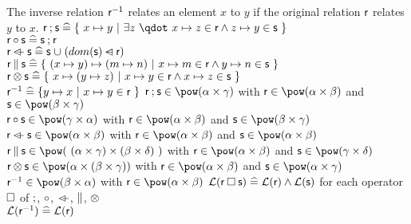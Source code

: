 \begin{samepage}
\begin{rodinrefentry}
    The inverse relation $\textsf{r}^{-1}$ relates an element $x$ to $y$ if the original relation $\textsf{r}$
    relates $y$ to $x$.
  \rrdef
    $\exprlr\fcomp\exprls \defi \{~x \mapsto y~|~\exists z~\qdot~x \mapsto z \in\exprlr \land z \mapsto y\in\exprls~\}$\\
    $\textsf{r}\circ\textsf{s} \mathrel{\widehat=} \textsf{s}\mathbin;\textsf{r}$\\
    $\textsf{r}\mathbin{\lhd\mkern-9mu-}\textsf{s} \mathrel{\widehat=} \textsf{s}\mathbin{\mkern1mu\cup\mkern1mu} (dom(\textsf{s})\mathbin{\lhd\mkern-14mu-}\textsf{r})$\\
    $\textsf{r}\mathbin\|\textsf{s} \mathrel{\widehat=} \{~(x\mapsto y)\mapsto(m\mapsto n)~|~x\mapsto m\in\textsf{r}\land y\mapsto n\in\textsf{s} ~\}$\\
    $\textsf{r}\mathbin\otimes\textsf{s} \mathrel{\widehat=} \{~x\mapsto(y\mapsto z)~|~x\mapsto y\in\textsf{r} \land x\mapsto z\in\textsf{s} ~\}$\\
    $\textsf{r}^{-1} \mathrel{\widehat=} \{y\mapsto x~|~x\mapsto y\in\textsf{r}~\}$
  \rrtypes
    $\exprlr\fcomp\exprls\in\pow(\alpha\cprod\gamma)$ with $\exprlr\in\pow(\alpha\cprod\beta)$ and
      $\exprls\in\pow(\beta\cprod\gamma)$\\
    $\exprlr\bcomp\exprls\in\pow(\gamma\cprod\alpha)$ with $\exprlr\in\pow(\alpha\cprod\beta)$ and
      $\exprls\in\pow(\beta\cprod\gamma)$\\
    $\exprlr\ovl\exprls\in\pow(\alpha\cprod\beta)$ with $\exprlr\in\pow(\alpha\cprod\beta)$ and
      $\exprls\in\pow(\alpha\cprod\beta)$\\
    $\exprlr\pprod\exprls\in\pow(~(\alpha\cprod\gamma)\cprod(\beta\cprod\delta)~)$ with
      $\exprlr\in\pow(\alpha\cprod\beta)$ and
      $\exprls\in\pow(\gamma\cprod\delta)$\\
    $\exprlr\dprod\exprls\in\pow(\alpha\cprod(\beta\cprod\gamma))$ with $\exprlr\in\pow(\alpha\cprod\beta)$ and
      $\exprls\in\pow(\alpha\cprod\gamma)$\\
    $\exprlr^{-1}\in\pow(\beta\cprod\alpha)$ with $\exprlr\in\pow(\alpha\cprod\beta)$
  \rrwd
    $\mathcal{L}(\textsf{r}\mathbin{\Box}\textsf{s})\mathrel{\widehat=}\mathcal{L}(\textsf{r})\land\mathcal{L}(\textsf{s})$ for each operator $\mathbin{\Box}$ of
    $\mathbin;$, $\circ$, $\mathbin{\lhd\mkern-9mu-}$, $\mathbin\|$, $\mathbin\otimes$\\
    $\mathcal{L}(\textsf{r}^{-1})\mathrel{\widehat=}\mathcal{L}(\textsf{r})$
\end{rodinrefentry}
\end{samepage}

